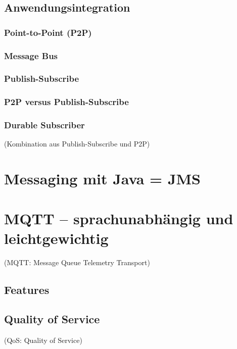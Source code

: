 \subsection{Anwendungsintegration}

\subsubsection{Point-to-Point (P2P)}

\subsubsection{Message Bus}

\subsubsection{Publish-Subscribe}

\subsubsection{P2P versus Publish-Subscribe}

\subsubsection{Durable Subscriber}
(Kombination aus Publish-Subscribe und P2P)

\section{Messaging mit Java = JMS}

\section{MQTT -- sprachunabhängig und leichtgewichtig}
(MQTT: Message Queue Telemetry Transport)
\subsection{Features}
\subsection{Quality of Service}
(QoS: Quality of Service)

